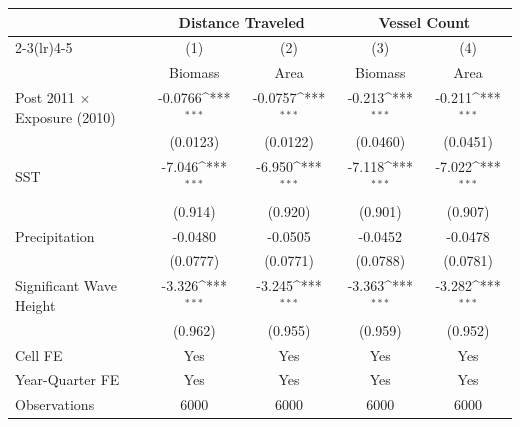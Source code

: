 {
\def\sym#1{\ifmmode^{#1}\else\(^{#1}\)\fi}
\begin{tabular}{l*{4}{c}}
\hline\hline
                    &\multicolumn{2}{c}{Distance Traveled} &\multicolumn{2}{c}{Vessel Count}           \\\cmidrule(lr){2-3}\cmidrule(lr){4-5}
                    &\multicolumn{1}{c}{(1)}&\multicolumn{1}{c}{(2)}&\multicolumn{1}{c}{(3)}&\multicolumn{1}{c}{(4)}\\
                    &\multicolumn{1}{c}{Biomass}&\multicolumn{1}{c}{Area}&\multicolumn{1}{c}{Biomass}&\multicolumn{1}{c}{Area}\\
\hline
Post 2011 $\times$ Exposure (2010)&     -0.0766\sym{***}&     -0.0757\sym{***}&      -0.213\sym{***}&      -0.211\sym{***}\\
                    &    (0.0123)         &    (0.0122)         &    (0.0460)         &    (0.0451)         \\
[1em]
SST                 &      -7.046\sym{***}&      -6.950\sym{***}&      -7.118\sym{***}&      -7.022\sym{***}\\
                    &     (0.914)         &     (0.920)         &     (0.901)         &     (0.907)         \\
[1em]
Precipitation       &     -0.0480         &     -0.0505         &     -0.0452         &     -0.0478         \\
                    &    (0.0777)         &    (0.0771)         &    (0.0788)         &    (0.0781)         \\
[1em]
Significant Wave Height&      -3.326\sym{***}&      -3.245\sym{***}&      -3.363\sym{***}&      -3.282\sym{***}\\
                    &     (0.962)         &     (0.955)         &     (0.959)         &     (0.952)         \\
\hline
Cell FE             &         Yes         &         Yes         &         Yes         &         Yes         \\
Year-Quarter FE     &         Yes         &         Yes         &         Yes         &         Yes         \\
Observations        &        6000         &        6000         &        6000         &        6000         \\
\hline\hline
\end{tabular}
}
